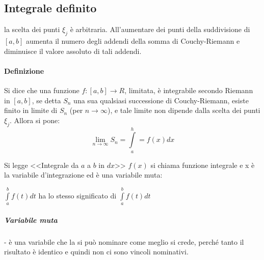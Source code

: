 \subsection{Integrale definito}
la scelta dei punti $\xi_j$ è arbitraria. All'aumentare dei punti della suddivisione di $[a,b]$ aumenta il numero degli addendi della somma di Couchy-Riemann e diminuisce il valore assoluto di tali addendi.
\paragraph{Definizione}
Si dice che una funzione $f:[a,b]\to R$, limitata, è integrabile secondo Riemann in $[a,b]$, se detta $S_n$ una sua qualsiasi successione di Couchy-Riemann, esiste finito in limite di $S_n$ (per $n\to \infty$), e tale limite non dipende dalla scelta dei punti $\xi_j$. Allora si pone:
\begin{equation*}
	\lim_{n\to\infty}S_n=\int\limits^h_a=f(x)dx
\end{equation*}

Si legge <<Integrale da $a$ a $b$ in $dx$>> $f(x)$ si chiama funzione integrale e x è la variabile d'integrazione ed è una variabile muta:
\begin{center}
	$\int\limits^b_af(t)dt$ ha lo stesso significato di $\int\limits^b_af(t)dt$ 
\end{center}
\subparagraph{Variabile muta} - è una variabile che la si può nominare come meglio si crede, perché tanto il risultato è identico e quindi non ci sono vincoli nominativi.
